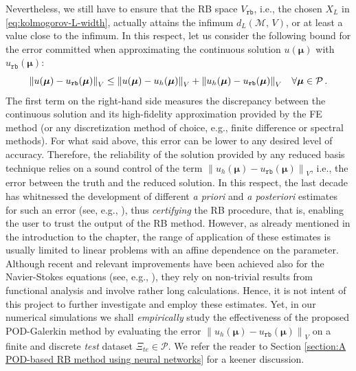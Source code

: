 \documentclass[12pt, a4paper, twoside, openright]{report}
\numberwithin{equation}{chapter}
\theoremstyle{theorem}
\theoremstyle{definition}
\theoremstyle{remark}
\theoremstyle{proposition}
\numberwithin{figure}{chapter}
\newcommand{\norm}[1]{\left\lVert#1\right\rVert}
\newcommand{\bg}[1]{\boldsymbol{#1}}
\begin{document}
		Nevertheless, we still have to ensure that the RB space $V_{\texttt{rb}}$, i.e., the chosen $X_L$ in \eqref{eq:kolmogorov-L-width}, actually attains the infimum $d_L(\mathcal{M}, \, V)$, or at least a value close to the infimum. In this respect, let us consider the following bound for the error committed when approximating the continuous solution $u(\bg{\mu})$ with $u_{\texttt{rb}}(\bg{\mu})$:
		\begin{equation*}
			\norm{u(\bg{\mu}) - u_{\texttt{rb}}(\bg{\mu})}_V \leq \norm{u(\bg{\mu}) - u_h(\bg{\mu})}_V + \norm{u_h(\bg{\mu}) - u_{\texttt{rb}}(\bg{\mu})}_V \hspace*{0.3cm} \forall \bg{\mu} \in \mathcal{P} \, .
		\end{equation*}
		The first term on the right-hand side measures the discrepancy between the continuous solution and its high-fidelity approximation provided by the FE method (or any discretization method of choice, e.g., finite difference or spectral methods). For what said above, this error can be lower to any desired level of accuracy. Therefore, the reliability of the solution provided by any reduced basis technique relies on a sound control of the term $\norm{u_h(\bg{\mu}) - u_{\texttt{rb}}(\bg{\mu})}_V$, i.e., the error between the truth and the reduced solution. In this respect, the last decade has whitnessed the development of different \emph{a priori} and \emph{a posteriori} estimates for such an error (see, e.g., \cite{Buf12, HSR16, Mad06}), thus \emph{certifying} the RB procedure, that is, enabling the user to trust the output of the RB method. However, as already mentioned in the introduction to the chapter, the range of application of these estimates is usually limited to linear problems with an affine dependence on the parameter. Although recent and relevant improvements have been achieved also for the Navier-Stokes equations (see, e.g., \cite{Dep08, QMN15}), they rely on non-trivial results from functional analysis and involve rather long calculations. Hence, it is not intent of this project to further investigate and employ these estimates. Yet, in our numerical simulations we shall \emph{empirically} study the effectiveness of the proposed POD-Galerkin method by evaluating the error $\norm{u_h(\bg{\mu}) - u_{\texttt{rb}}(\bg{\mu})}_V$ on a finite and discrete \emph{test} dataset $\Xi_{te} \in \mathcal{P}$. We refer the reader to Section \ref{section:A POD-based RB method using neural networks} for a keener discussion.
		
\end{document}
